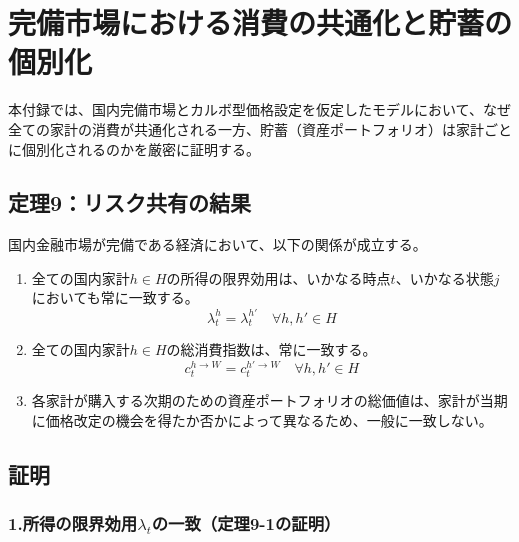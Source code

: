 
\chapter{完備市場における消費の共通化と貯蓄の個別化}
\label{chap:appendix_risk_sharing}

本付録では、国内完備市場とカルボ型価格設定を仮定したモデルにおいて、なぜ全ての家計の消費が共通化される一方、貯蓄（資産ポートフォリオ）は家計ごとに個別化されるのかを厳密に証明する。

\section*{定理9：リスク共有の結果}
\label{sec:appendix_risk_sharing_theorem9}

国内金融市場が完備である経済において、以下の関係が成立する。
\begin{enumerate}
    \item\label{itm:appendix_risk_sharing_theorem9_lambda}全ての国内家計\(h\in H\)の所得の限界効用は、いかなる時点\(t\)、いかなる状態\(j\)においても常に一致する。
    \begin{equation}
    \lambda_t^h=\lambda_t^{h'}\quad\forall h,h'\in H
    \label{eq:appendix_risk_sharing_theorem9_lambda_equality}
    \end{equation}
    \item\label{itm:appendix_risk_sharing_theorem9_consumption}全ての国内家計\(h\in H\)の総消費指数は、常に一致する。
    \begin{equation}
    c_t^{h\to W}=c_t^{h'\to W}\quad\forall h,h'\in H
    \label{eq:appendix_risk_sharing_theorem9_consumption_equality}
    \end{equation}
    \item\label{itm:appendix_risk_sharing_theorem9_portfolio}各家計が購入する次期のための資産ポートフォリオの総価値は、家計が当期に価格改定の機会を得たか否かによって異なるため、一般に一致しない。
\end{enumerate}

\section*{証明}
\label{sec:appendix_risk_sharing_proof}

\subsection*{1.所得の限界効用\(\lambda_t\)の一致（定理9-1の証明）}
\label{sec:appendix_risk_sharing_sub1}

